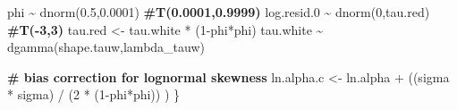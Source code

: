 \documentclass[french,11pt]{book}
\newenvironment{Shaded}{\begin{snugshade}}{\end{snugshade}}
\newcommand{\CommentTok}[1]{\textcolor[rgb]{0.56,0.35,0.01}{\textbf{#1}}}
\newcommand{\DecValTok}[1]{\textcolor[rgb]{0.00,0.00,0.81}{#1}}
\newcommand{\FloatTok}[1]{\textcolor[rgb]{0.00,0.00,0.81}{#1}}
\newcommand{\FunctionTok}[1]{\textcolor[rgb]{0.00,0.00,0.00}{#1}}
\newcommand{\NormalTok}[1]{#1}
\newcommand{\OtherTok}[1]{\textcolor[rgb]{0.56,0.35,0.01}{#1}}
\newcommand{\SpecialCharTok}[1]{\textcolor[rgb]{0.00,0.00,0.00}{#1}}
\begin{document}
\begin{Shaded}
\begin{Highlighting}[]
\NormalTok{phi }\SpecialCharTok{\textasciitilde{}} \FunctionTok{dnorm}\NormalTok{(}\FloatTok{0.5}\NormalTok{,}\FloatTok{0.0001}\NormalTok{) }\CommentTok{\#T(0.0001,0.9999)}
\NormalTok{log.resid}\FloatTok{.0} \SpecialCharTok{\textasciitilde{}} \FunctionTok{dnorm}\NormalTok{(}\DecValTok{0}\NormalTok{,tau.red) }\CommentTok{\#T({-}3,3)  }
\NormalTok{tau.red }\OtherTok{\textless{}{-}}\NormalTok{ tau.white }\SpecialCharTok{*}\NormalTok{ (}\DecValTok{1}\SpecialCharTok{{-}}\NormalTok{phi}\SpecialCharTok{*}\NormalTok{phi)     }
\NormalTok{tau.white }\SpecialCharTok{\textasciitilde{}} \FunctionTok{dgamma}\NormalTok{(shape.tauw,lambda\_tauw)    }

\CommentTok{\# bias correction for lognormal skewness}
\NormalTok{ln.alpha.c }\OtherTok{\textless{}{-}}\NormalTok{ ln.alpha }\SpecialCharTok{+}\NormalTok{ ((sigma }\SpecialCharTok{*}\NormalTok{ sigma) }\SpecialCharTok{/}\NormalTok{ (}\DecValTok{2} \SpecialCharTok{*}\NormalTok{ (}\DecValTok{1}\SpecialCharTok{{-}}\NormalTok{phi}\SpecialCharTok{*}\NormalTok{phi)) ) }
\NormalTok{\}}
\end{Highlighting}
\end{Shaded}
\end{document}
